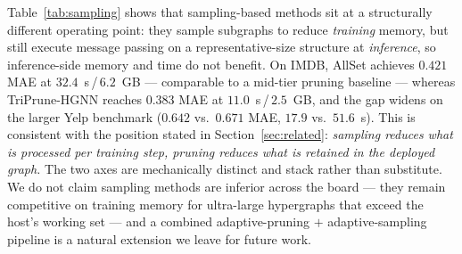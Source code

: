\documentclass[10pt]{article}
\theoremstyle{plain}
\theoremstyle{definition}
\begin{document}
\begin{table}[ht!]
\centering
\caption{\textbf{Sampling vs.\ pruning orthogonality probe.} AllSet and a GraphSAINT-adapted hypergraph sampler are compared with TriPrune-HGNN on three benchmarks. Mean$_{\pm\mathrm{std}}$ over 10 runs; lower MAE / Time / Memory is better. Time and Memory are end-to-end inference-side. \textbf{Best} in bold.}
\label{tab:sampling}
\setlength{\tabcolsep}{4pt}
\renewcommand{\arraystretch}{1.1}
\small
{}
\end{table}

Table~\ref{tab:sampling} shows that sampling-based methods sit at a structurally different operating point: they sample subgraphs to reduce \emph{training} memory, but still execute message passing on a representative-size structure at \emph{inference}, so inference-side memory and time do not benefit. On IMDB, AllSet achieves $0.421$ MAE at $32.4$~s\,/\,$6.2$~GB --- comparable to a mid-tier pruning baseline --- whereas TriPrune-HGNN reaches $0.383$ MAE at $11.0$~s\,/\,$2.5$~GB, and the gap widens on the larger Yelp benchmark ($0.642$ vs.\ $0.671$ MAE, $17.9$ vs.\ $51.6$~s). This is consistent with the position stated in Section~\ref{sec:related}: \emph{sampling reduces what is processed per training step, pruning reduces what is retained in the deployed graph.} The two axes are mechanically distinct and stack rather than substitute. We do not claim sampling methods are inferior across the board --- they remain competitive on training memory for ultra-large hypergraphs that exceed the host's working set --- and a combined adaptive-pruning $+$ adaptive-sampling pipeline is a natural extension we leave for future work.
\end{document}
